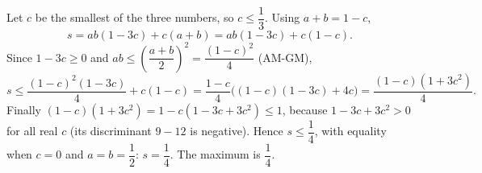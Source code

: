 Let $c$ be the smallest of the three numbers, so $c\le\dfrac{1}{3}$. Using $a+b=1-c$,
\[
s=ab(1-3c)+c(a+b)=ab(1-3c)+c(1-c).
\]
Since $1-3c\ge0$ and $ab\le\left(\dfrac{a+b}{2}\right)^2=\dfrac{(1-c)^2}{4}$ (AM-GM),
\[
s\le\dfrac{(1-c)^2(1-3c)}{4}+c(1-c)=\dfrac{1-c}{4}\bigl((1-c)(1-3c)+4c\bigr)=\dfrac{(1-c)(1+3c^2)}{4}.
\]
Finally $(1-c)(1+3c^2)=1-c(1-3c+3c^2)\le1$, because $1-3c+3c^2>0$ for all real $c$ (its discriminant $9-12$ is negative). Hence $s\le\dfrac{1}{4}$, with equality when $c=0$ and $a=b=\dfrac{1}{2}$: $s=\dfrac{1}{4}$. The maximum is $\boxed{\dfrac{1}{4}}$.
